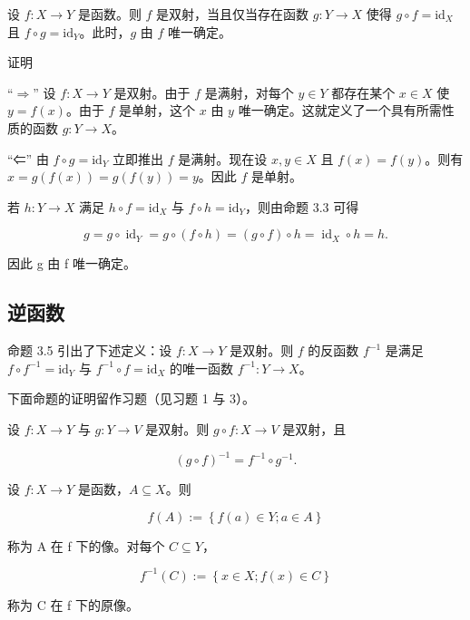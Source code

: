 \begin{proposition}

设 $f: X \to Y$ 是函数。则 $f$ 是双射，当且仅当存在函数 $g: Y \to X$ 使得 $g \circ f = \mathrm{id}_X$ 且 $f \circ g = \mathrm{id}_Y$。此时，$g$ 由 $f$ 唯一确定。

证明

\begin{subitems}
\item

“$\Rightarrow$” 设 $f: X \to Y$ 是双射。由于 $f$ 是满射，对每个 $y \in Y$ 都存在某个 $x \in X$ 使 $y = f(x)$。由于 $f$ 是单射，这个 $x$ 由 $y$ 唯一确定。这就定义了一个具有所需性质的函数 $g: Y \to X$。

\item

“⇐” 由 $f \circ g = \mathrm{id}_{Y}$ 立即推出 $f$ 是满射。现在设 $x, y \in X$ 且 $f(x) = f(y)$。则有 $x = g(f(x)) = g(f(y)) = y$。因此 $f$ 是单射。

\item

若 $h: Y \to X$ 满足 $h \circ f = \mathrm{id}_{X}$ 与 $f \circ h = \mathrm{id}_{Y}$，则由命题 3.3 可得

\[
g=g\circ\operatorname{id}_{Y}=g\circ(f\circ h)=(g\circ f)\circ h=\operatorname{id}_{X}\circ h=h.
\]

因此 g 由 f 唯一确定。

\end{subitems}

\end{proposition}

\subsection*{逆函数}

命题 3.5 引出了下述定义：设 $f: X \to Y$ 是双射。则 $f$ 的反函数 $f^{-1}$ 是满足 $f \circ f^{-1} = \mathrm{id}_{Y}$ 与 $f^{-1} \circ f = \mathrm{id}_{X}$ 的唯一函数 $f^{-1}: Y \to X$。

下面命题的证明留作习题（见习题 1 与 3）。

\begin{proposition}

设 $f: X \to Y$ 与 $g: Y \to V$ 是双射。则 $g \circ f: X \to V$ 是双射，且

\[
(g\circ f)^{-1}=f^{-1}\circ g^{-1}.
\]

设 $f: X \to Y$ 是函数，$A \subseteq X$。则

\[
f(A):=\left\{f(a)\in Y;a\in A\right\}
\]

称为 A 在 f 下的像。对每个 $C \subseteq Y$，

\[
f^{-1}(C):=\left\{x\in X;f(x)\in C\right\}
\]

称为 C 在 f 下的原像。

\end{proposition}

